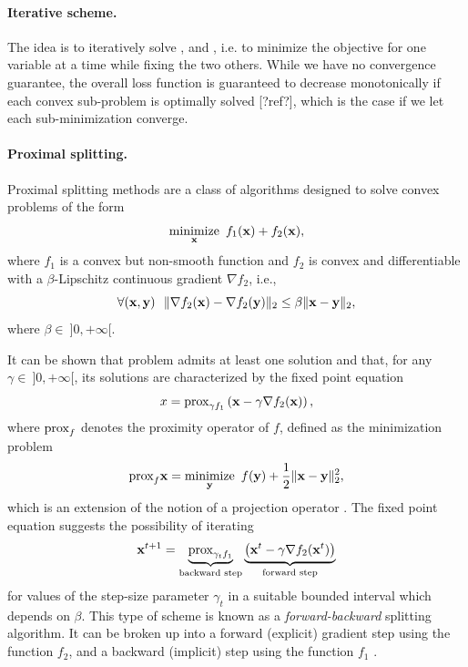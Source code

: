 \paragraph{Iterative scheme.}
The idea is to iteratively solve ,  and , i.e. to minimize the objective for one variable at a time while fixing the two others.
{\color{red} While we have no convergence guarantee, the overall loss function is guaranteed to decrease monotonically if each convex sub-problem is optimally solved [?ref?], which is the case if we let each sub-minimization converge.}

\paragraph{Proximal splitting.}
Proximal splitting methods are a class of algorithms designed to solve convex problems of the form
\begin{equation} \label{eqn:convex_prob}
	\operatorname*{minimize}\limits_{\mathbf{x}} \  f_1(\mathbf{x}) + f_2(\mathbf{x}),
\end{equation}
where $f_1$ is a convex but non-smooth function and $f_2$ is convex and differentiable with a $\beta$-Lipschitz continuous gradient $\nabla f_2$, i.e.,
\begin{equation}
	\forall(\mathbf{x},\mathbf{y}) \ \ \|\nabla f_2(\mathbf{x}) - \nabla f_2(\mathbf{y}) \|_2 \leq \beta \| \mathbf{x} - \mathbf{y} \|_2 ,
\end{equation}
where $\beta \in \ ]0,+\infty[$.

It can be shown \cite{combettes2005forwardBackward} that problem  admits at least one solution and that, for any $\gamma \in \ ]0,+\infty[$, its solutions are characterized by the fixed point equation
\begin{equation} \label{eqn:fixed_point}
	x = \text{prox}_{\gamma f_1} \left( \mathbf{x} - \gamma \nabla f_2(\mathbf{x}) \right),
\end{equation}
where $\text{prox}_{f}$ denotes the proximity operator of $f$, defined as the minimization problem
\begin{equation}
	\text{prox}_{f} \mathbf{x} = \operatorname*{minimize}\limits_{\mathbf{y}} \  f(\mathbf{y}) + \frac{1}{2} \| \mathbf{x} - \mathbf{y} \|_2^2,
\end{equation}
which is an extension of the notion of a projection operator \cite{moreau1962prox}.
The fixed point equation  suggests the possibility of iterating
\begin{equation}
	\mathbf{x}^{t+1} = \underbrace{\text{prox}_{\gamma_t f_1}}_\text{backward step} \underbrace{ \left( \mathbf{x}^t - \gamma \nabla f_2(\mathbf{x}^t) \right) }_\text{forward step}
\end{equation}
for values of the step-size parameter $\gamma_t$ in a suitable bounded interval which depends on $\beta$. This type of scheme is known as a \textit{forward-backward} splitting algorithm. It can be broken up into a forward (explicit) gradient
step using the function $f_2$, and a backward (implicit) step using the function $f_1$ \cite{combettes2011proximalSplitting}.

